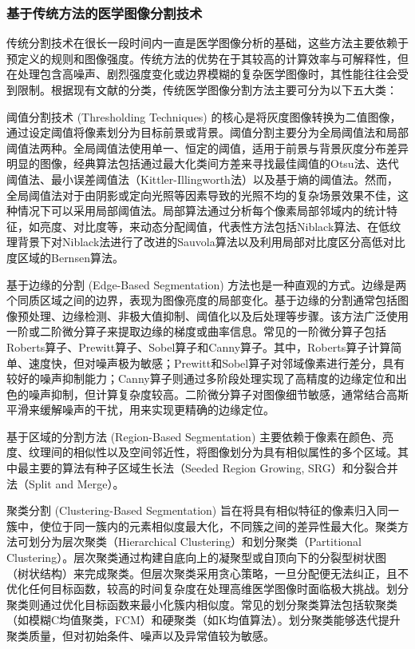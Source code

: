 \documentclass[12pt, a4paper, twoside]{article}
\begin{document}
\subsubsection{基于传统方法的医学图像分割技术}


传统分割技术在很长一段时间内一直是医学图像分析的基础，这些方法主要依赖于预定义的规则和图像强度。传统方法的优势在于其较高的计算效率与可解释性，但在处理包含高噪声、剧烈强度变化或边界模糊的复杂医学图像时，其性能往往会受到限制。根据现有文献的分类，传统医学图像分割方法主要可分为以下五大类：

阈值分割技术 (Thresholding Techniques) 的核心是将灰度图像转换为二值图像，通过设定阈值将像素划分为目标前景或背景。阈值分割主要分为全局阈值法和局部阈值法两种。全局阈值法使用单一、恒定的阈值，适用于前景与背景灰度分布差异明显的图像，经典算法包括通过最大化类间方差来寻找最佳阈值的Otsu法、迭代阈值法、最小误差阈值法（Kittler-Illingworth法）以及基于熵的阈值法。然而，全局阈值法对于由阴影或定向光照等因素导致的光照不均的复杂场景效果不佳，这种情况下可以采用局部阈值法。局部算法通过分析每个像素局部邻域内的统计特征，如亮度、对比度等，来动态分配阈值，代表性方法包括Niblack算法、在低纹理背景下对Niblack法进行了改进的Sauvola算法以及利用局部对比度区分高低对比度区域的Bernsen算法。

基于边缘的分割 (Edge-Based Segmentation) 方法也是一种直观的方式。边缘是两个同质区域之间的边界，表现为图像亮度的局部变化。基于边缘的分割通常包括图像预处理、边缘检测、非极大值抑制、阈值化以及后处理等步骤。该方法广泛使用一阶或二阶微分算子来提取边缘的梯度或曲率信息。常见的一阶微分算子包括Roberts算子、Prewitt算子、Sobel算子和Canny算子。其中，Roberts算子计算简单、速度快，但对噪声极为敏感；Prewitt和Sobel算子对邻域像素进行差分，具有较好的噪声抑制能力；Canny算子则通过多阶段处理实现了高精度的边缘定位和出色的噪声抑制，但计算复杂度较高。二阶微分算子对图像细节敏感，通常结合高斯平滑来缓解噪声的干扰，用来实现更精确的边缘定位。

基于区域的分割方法 (Region-Based Segmentation) 主要依赖于像素在颜色、亮度、纹理间的相似性以及空间邻近性，将图像划分为具有相似属性的多个区域。其中最主要的算法有种子区域生长法（Seeded Region Growing, SRG）和分裂合并法（Split and Merge）。

聚类分割 (Clustering-Based Segmentation) 旨在将具有相似特征的像素归入同一簇中，使位于同一簇内的元素相似度最大化，不同簇之间的差异性最大化。聚类方法可划分为层次聚类（Hierarchical Clustering）和划分聚类（Partitional Clustering）。层次聚类通过构建自底向上的凝聚型或自顶向下的分裂型树状图（树状结构）来完成聚类。但层次聚类采用贪心策略，一旦分配便无法纠正，且不优化任何目标函数，较高的时间复杂度在处理高维医学图像时面临极大挑战。划分聚类则通过优化目标函数来最小化簇内相似度。常见的划分聚类算法包括软聚类（如模糊C均值聚类，FCM）和硬聚类（如K均值算法）。划分聚类能够迭代提升聚类质量，但对初始条件、噪声以及异常值较为敏感。
\end{document}

